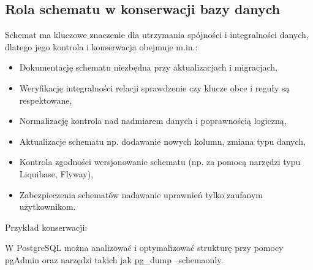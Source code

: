 \documentclass[a4paper,11pt,polish]{sphinxmanual}
\begin{document}
\subsection{Rola schematu w konserwacji bazy danych}
\label{\detokenize{Kontrola_i_konserwacja/kontrola_i_konserwacja:rola-schematu-w-konserwacji-bazy-danych}}
\sphinxAtStartPar
Schemat ma kluczowe znaczenie dla utrzymania spójności i integralności danych, dlatego jego kontrola i konserwacja obejmuje m.in.:
\begin{itemize}
\item {} 
\sphinxAtStartPar
Dokumentację schematu \sphinxhyphen{} niezbędna przy aktualizacjach i migracjach,

\item {} 
\sphinxAtStartPar
Weryfikację integralności relacji \sphinxhyphen{} sprawdzenie czy klucze obce i reguły są respektowane,

\item {} 
\sphinxAtStartPar
Normalizację \sphinxhyphen{} kontrola nad nadmiarem danych i poprawnością logiczną,

\item {} 
\sphinxAtStartPar
Aktualizacje schematu \sphinxhyphen{} np. dodawanie nowych kolumn, zmiana typu danych,

\item {} 
\sphinxAtStartPar
Kontrola zgodności \sphinxhyphen{} wersjonowanie schematu (np. za pomocą narzędzi typu Liquibase, Flyway),

\item {} 
\sphinxAtStartPar
Zabezpieczenia schematów \sphinxhyphen{} nadawanie uprawnień tylko zaufanym użytkownikom.

\end{itemize}

\sphinxAtStartPar
Przykład konserwacji:

\sphinxAtStartPar
W PostgreSQL można analizować i optymalizować strukturę przy pomocy pgAdmin oraz narzędzi takich jak pg\_dump –schema\sphinxhyphen{}only.
\end{document}
